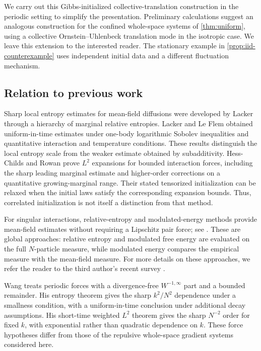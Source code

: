 \documentclass[11pt,reqno]{amsart}
\numberwithin{equation}{section}
\theoremstyle{plain}
\theoremstyle{remark}
\begin{document}
We carry out this Gibbs-initialized collective-translation construction in the periodic setting to simplify the presentation. Preliminary calculations suggest an analogous construction for the confined whole-space systems of \cref{thm:uniform}, using a collective Ornstein--Uhlenbeck translation mode in the isotropic case. We leave this extension to the interested reader. The stationary example in \cref{prop:iid-counterexample} uses independent initial data and a different fluctuation mechanism.


\subsection{Relation to previous work}\label{sec:previous-work}
Sharp local entropy estimates for mean-field diffusions were developed by Lacker \cite{Lacker} through a hierarchy of marginal relative entropies. Lacker and Le Flem \cite{LackerLeFlem} obtained uniform-in-time estimates under one-body logarithmic Sobolev inequalities and quantitative interaction and temperature conditions. These results distinguish the local entropy scale from the weaker estimate obtained by subadditivity. Hess-Childs and Rowan \cite[Theorem 1.4 and Remarks 1.6 and 1.8]{HCR} prove $L^2$ expansions for bounded interaction forces, including the sharp leading marginal estimate and higher-order corrections on a quantitative growing-marginal range. Their stated tensorized initialization can be relaxed when the initial laws satisfy the corresponding expansion bounds. Thus, correlated initialization is not itself a distinction from that method.


For singular interactions, relative-entropy and modulated-energy methods provide mean-field estimates without requiring a Lipschitz pair force; see \cite{JabinWang2018,BJW,BJWPKS,NguyenRosenzweigSerfaty,RSdiffusive,RSlsi,CdCRSRepulsive,CdCRSAttractive}. These are global approaches: relative entropy and modulated free energy are evaluated on the full $N$-particle measure, while modulated energy compares the empirical measure with the mean-field measure. For more details on these approaches, we refer the reader to the third author's recent survey \cite{RosenzweigJEDP}.

\begingroup
Wang \cite[Theorems 1--2 and Remark 2]{WangSharpLocal} treats periodic forces with a divergence-free $W^{-1,\infty}$ part and a bounded remainder. His entropy theorem gives the sharp $k^2/N^2$ dependence under a smallness condition, with a uniform-in-time conclusion under additional decay assumptions. His short-time weighted $L^2$ theorem gives the sharp $N^{-2}$ order for fixed $k$, with exponential rather than quadratic dependence on $k$. These force hypotheses differ from those of the repulsive whole-space gradient systems considered here.
\par\endgroup
\end{document}
